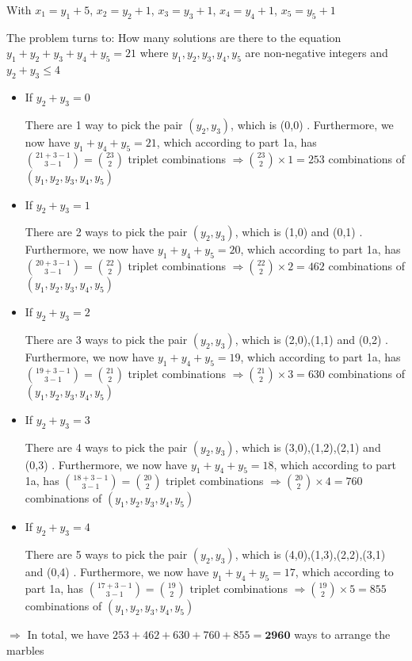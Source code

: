 \documentclass[12pt]{amsart}
\begin{document}
With $x_1 = y_1+5$, $x_2= y_2+1$,  $x_3= y_3+1$,  $x_4= y_4+1$, $x_5 = y_5 +1$ 

The problem turns to: How many solutions are there to the equation  $y_1 + y_2 + y_3 + y_4 +y_5 = 21$
where  $y_1, y_2, y_3, y_4, y_5$ are non-negative integers
and $y_2+y_3\leq 4$

\begin{itemize}
    \item If $y_2+y_3=0$
    
    There are 1 way to pick the pair $(y_2,y_3)$, which is (0,0)
    . Furthermore, we now have $y_1+y_4+y_5=21$, which according to part 1a, has $\binom{21+3-1}{3-1}=\binom{23}{2}$ triplet combinations
    $\Rightarrow \binom{23}{2}\times1=253$ combinations of $(y_1,y_2,y_3,y_4,y_5)$

    
    \item If $y_2+y_3=1$
    
    There are 2 ways to pick the pair $(y_2,y_3)$, which is (1,0) and (0,1)
    . Furthermore, we now have $y_1+y_4+y_5=20$, which according to part 1a, has $\binom{20+3-1}{3-1}=\binom{22}{2}$ triplet combinations
    $\Rightarrow \binom{22}{2}\times2=462$ combinations of $(y_1,y_2,y_3,y_4,y_5)$
    \item If $y_2+y_3=2$
    
    There are 3 ways to pick the pair $(y_2,y_3)$, which is (2,0),(1,1) and (0,2)
    . Furthermore, we now have $y_1+y_4+y_5=19$, which according to part 1a, has $\binom{19+3-1}{3-1}=\binom{21}{2}$ triplet combinations
    $\Rightarrow \binom{21}{2}\times3=630$ combinations of $(y_1,y_2,y_3,y_4,y_5)$
    \item If $y_2+y_3=3$
    
    There are 4 ways to pick the pair $(y_2,y_3)$, which is (3,0),(1,2),(2,1) and (0,3)
    . Furthermore, we now have $y_1+y_4+y_5=18$, which according to part 1a, has $\binom{18+3-1}{3-1}=\binom{20}{2}$ triplet combinations
    $\Rightarrow \binom{20}{2}\times4=760$ combinations of $(y_1,y_2,y_3,y_4,y_5)$
    \item If $y_2+y_3=4$
    
    There are 5 ways to pick the pair $(y_2,y_3)$, which is (4,0),(1,3),(2,2),(3,1) and (0,4)
    . Furthermore, we now have $y_1+y_4+y_5=17$, which according to part 1a, has $\binom{17+3-1}{3-1}=\binom{19}{2}$ triplet combinations
    $\Rightarrow \binom{19}{2}\times5=855$ combinations of $(y_1,y_2,y_3,y_4,y_5)$
    
\end{itemize}
    $\Rightarrow$ In total, we have $253+462+630+760+855=\mathbf{2960}$ ways to arrange the marbles
\newpage
\end{document}
